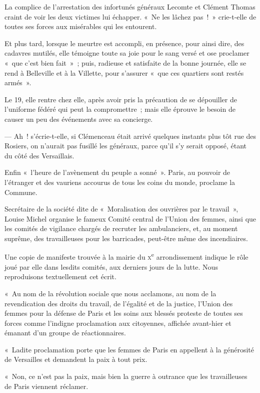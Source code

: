 \documentclass[french,twoside]{book} %
\begin{document}
La complice de l’arrestation des infortunés généraux Lecomte et Clément Thomas craint de voir les deux victimes lui échapper. « Ne les lâchez pas ! » crie-t-elle de toutes ses forces aux misérables qui les entourent.\par
Et plus tard, lorsque le meurtre est accompli, en présence, pour ainsi dire, des cadavres mutilés, elle témoigne toute sa joie pour le sang versé et ose proclamer « que c’est bien fait » ; puis, radieuse et satisfaite de la bonne journée, elle se rend à Belleville et à la Villette, pour s’assurer « que ces quartiers sont restés armés ».\par
Le 19, elle rentre chez elle, après avoir pris la précaution de se dépouiller de l’uniforme fédéré qui peut la compromettre ; mais elle éprouve le besoin de causer un peu des événements avec sa concierge.\par
— Ah ! s’écrie-t-elle, si Clémenceau était arrivé quelques instants plus tôt rue des Rosiers, on n’aurait pas fusillé les généraux, parce qu’il s’y serait opposé, étant du côté des Versaillais.\par
Enfin « l’heure de l’avènement du peuple a sonné ». Paris, au pouvoir de l’étranger et des vauriens accourus de tous les coins du monde, proclame la Commune.\par
Secrétaire de la société dite de « Moralisation des ouvrières par le travail », Louise Michel organise le fameux Comité central  de l’Union des femmes, ainsi que les comités de vigilance chargés de recruter les ambulanciers, et, au moment suprême, des travailleuses pour les barricades, peut-être même des incendiaires.\par
Une copie de manifeste trouvée à la mairie du {\scshape x}\textsuperscript{e} arrondissement indique le rôle joué par elle dans lesdits comités, aux derniers jours de la lutte. Nous reproduisons textuellement cet écrit.\par
\bigbreak
\noindent « Au nom de la révolution sociale que nous acclamons, au nom de la revendication des droits du travail, de l’égalité et de la justice, l’Union des femmes pour la défense de Paris et les soins aux blessés proteste de toutes ses forces comme l’indigne proclamation aux citoyennes, affichée avant-hier et émanant d’un groupe de réactionnaires.\par
« Ladite proclamation porte que les femmes de Paris en appellent à la générosité de Versailles et demandent la paix à tout prix.\par
« Non, ce n’est pas la paix, mais bien la guerre à outrance que les travailleuses de Paris viennent réclamer.\par
\end{document}
